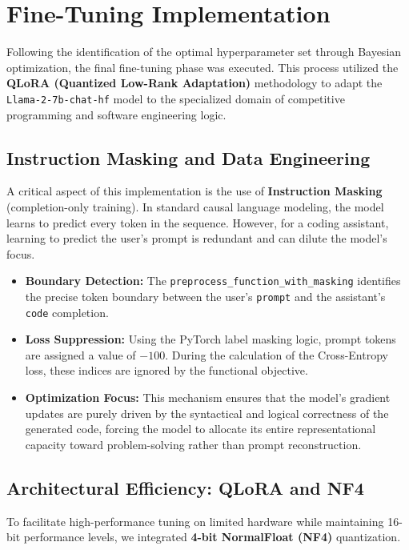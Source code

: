 \section{Fine-Tuning Implementation}

Following the identification of the optimal hyperparameter set through Bayesian optimization, the final fine-tuning phase was executed. This process utilized the \textbf{QLoRA (Quantized Low-Rank Adaptation)} methodology to adapt the \texttt{Llama-2-7b-chat-hf} model to the specialized domain of competitive programming and software engineering logic.

\subsection{Instruction Masking and Data Engineering}
A critical aspect of this implementation is the use of \textbf{Instruction Masking} (completion-only training). In standard causal language modeling, the model learns to predict every token in the sequence. However, for a coding assistant, learning to predict the user's prompt is redundant and can dilute the model's focus.

\begin{itemize}
    \item \textbf{Boundary Detection:} The \texttt{preprocess\_function\_with\_masking} identifies the precise token boundary between the user's \texttt{prompt} and the assistant's \texttt{code} completion.
    \item \textbf{Loss Suppression:} Using the PyTorch label masking logic, prompt tokens are assigned a value of $-100$. During the calculation of the Cross-Entropy loss, these indices are ignored by the functional objective.
    \item \textbf{Optimization Focus:} This mechanism ensures that the model’s gradient updates are purely driven by the syntactical and logical correctness of the generated code, forcing the model to allocate its entire representational capacity toward problem-solving rather than prompt reconstruction.
\end{itemize}



\subsection{Architectural Efficiency: QLoRA and NF4}
To facilitate high-performance tuning on limited hardware while maintaining 16-bit performance levels, we integrated \textbf{4-bit NormalFloat (NF4)} quantization.


